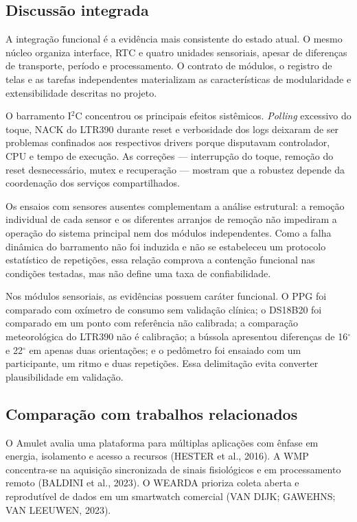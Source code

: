 \documentclass[a4paper,12pt]{article}
\begin{document}
\subsection{Discuss\~ao integrada}


A integra\c{c}\~ao funcional \'e a evid\^encia mais consistente do estado atual. O mesmo n\'ucleo organiza interface, RTC e quatro unidades sensoriais, apesar de diferen\c{c}as de transporte, per\'iodo e processamento. O contrato de m\'odulos, o registro de telas e as tarefas independentes materializam as caracter\'isticas de modularidade e extensibilidade descritas no projeto.


O barramento I$^2$C concentrou os principais efeitos sist\^emicos. \emph{Polling} excessivo do toque, NACK do LTR390 durante reset e verbosidade dos logs deixaram de ser problemas confinados aos respectivos drivers porque disputavam controlador, CPU e tempo de execu\c{c}\~ao. As corre\c{c}\~oes --- interrup\c{c}\~ao do toque, remo\c{c}\~ao do reset desnecess\'ario, mutex e recupera\c{c}\~ao --- mostram que a robustez depende da coordena\c{c}\~ao dos servi\c{c}os compartilhados.


Os ensaios com sensores ausentes complementam a an\'alise estrutural: a remo\c{c}\~ao individual de cada sensor e os diferentes arranjos de remo\c{c}\~ao n\~ao impediram a opera\c{c}\~ao do sistema principal nem dos m\'odulos independentes. Como a falha din\^amica do barramento n\~ao foi induzida e n\~ao se estabeleceu um protocolo estat\'istico de repeti\c{c}\~oes, essa rela\c{c}\~ao comprova a conten\c{c}\~ao funcional nas condi\c{c}\~oes testadas, mas n\~ao define uma taxa de confiabilidade.


Nos m\'odulos sensoriais, as evid\^encias possuem car\'ater funcional. O PPG foi comparado com ox\'imetro de consumo sem valida\c{c}\~ao cl\'inica; o DS18B20 foi comparado em um ponto com refer\^encia n\~ao calibrada; a compara\c{c}\~ao meteorol\'ogica do LTR390 n\~ao \'e calibra\c{c}\~ao; a b\'ussola apresentou diferen\c{c}as de 16$^\circ$ e 22$^\circ$ em apenas duas orienta\c{c}\~oes; e o ped\^ometro foi ensaiado com um participante, um ritmo e duas repeti\c{c}\~oes. Essa delimita\c{c}\~ao evita converter plausibilidade em valida\c{c}\~ao.


\subsection{Compara\c{c}\~ao com trabalhos relacionados}


O Amulet avalia uma plataforma para m\'ultiplas aplica\c{c}\~oes com \^enfase em energia, isolamento e acesso a recursos (HESTER et al., 2016). A WMP concentra-se na aquisi\c{c}\~ao sincronizada de sinais fisiol\'ogicos e em processamento remoto (BALDINI et al., 2023). O WEARDA prioriza coleta aberta e reprodut\'ivel de dados em um smartwatch comercial (VAN DIJK; GAWEHNS; VAN LEEUWEN, 2023).
\end{document}
